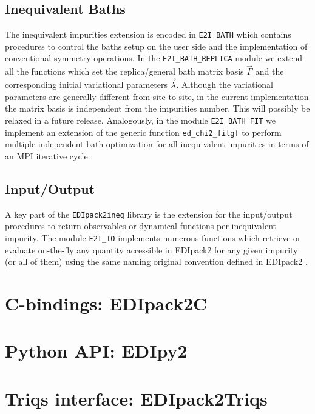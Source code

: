 \documentclass[preprint,3p,10pt]{elsarticle}
\def\NAME{{\rm EDIpack2 }}
\begin{document}
\subsection{Inequivalent Baths}\label{sSecIneqBath}
The inequivalent impurities extension is encoded in {\tt E2I\_BATH}
which contains procedures to control the baths setup on the user side
and the  implementation of conventional symmetry operations.
In the {\tt E2I\_BATH\_REPLICA} module we extend all the functions
which set the replica/general bath matrix basis 
$\vec{\Gamma}$ and the corresponding initial variational parameters
$\vec{\lambda}$. Although the variational parameters are generally
different from site to site, in the current implementation the matrix
basis is independent from the impurities number. This will possibly be
relaxed in a future release. 
Analogously, in the module {\tt E2I\_BATH\_FIT} we implement an extension of the generic
function {\tt ed\_chi2\_fitgf} to perform multiple independent
bath optimization for all inequivalent impurities in terms of an MPI iterative cycle. 
 
\subsection{Input/Output}\label{sSecIneqIO}
A key part of the {\tt EDIpack2ineq} library is the extension for the
input/output procedures to return observables or dynamical functions per inequivalent impurity.
The module {\tt E2I\_IO} implements numerous functions which retrieve
or evaluate on-the-fly any quantity accessible in \NAME for any given
impurity (or all of them) using the same naming original convention
defined in \NAME.       







\section{C-bindings: EDIpack2C}\label{SecCbind}

\section{Python API: EDIpy2}\label{SecPyAPI}


\section{Triqs interface: EDIpack2Triqs}\label{SecEDI2Triqs}
\end{document}
